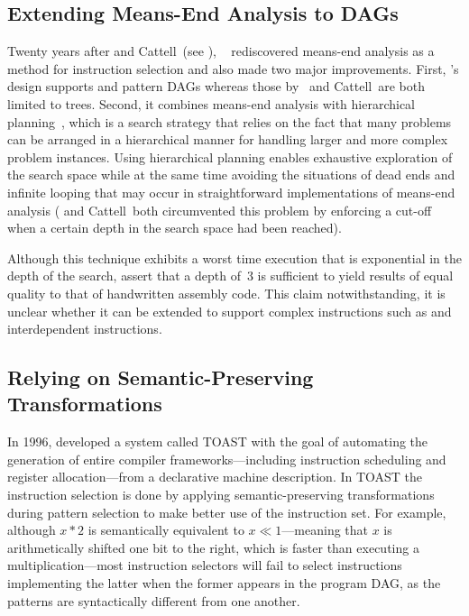 \subsection{Extending Means-End Analysis to DAGs}

Twenty years after \citeauthor{Newcomer1975} and Cattell~\etal (see
),
\citeauthor{Yu1994a}~\cite{Yu1994a, Yu1994b} rediscovered \gls{means-end
  analysis} as a method for \gls{instruction selection} and also made two major
improvements.
%
First, \citeauthor{Yu1994a}'s design supports  and \glspl{pattern DAG} whereas those by~\citeauthor{Newcomer1975} and
Cattell~\etal are both limited to \glspl{tree}.
%
Second, it combines
\gls{means-end analysis} with \gls{hierarchical planning}~\cite{Sacerdoti1973},
which is a search strategy that relies on the fact that many problems can be
arranged in a hierarchical manner for handling larger and more complex problem
instances.
%
Using hierarchical planning enables exhaustive exploration of the
search space while at the same time avoiding the situations of dead ends and
infinite looping that may occur in straightforward implementations of
\gls{means-end analysis} (\citeauthor{Newcomer1975} and Cattell~\etal both
circumvented this problem by enforcing a cut-off when a certain depth in the
search space had been reached).

Although this technique exhibits a worst time execution that is exponential in
the depth of the search, \citeauthor{Yu1994a} assert that a depth of~3 is
sufficient to yield results of equal quality to that of handwritten
\gls{assembly code}.
%
This claim notwithstanding, it is unclear whether it can be
extended to support complex \glspl{instruction} such as  and \glspl{interdependent instruction}.


\subsection{Relying on Semantic-Preserving Transformations}

In 1996, \textcite{Hoover1996} developed a system called \gls{TOAST} with the
goal of automating the generation of entire \gls{compiler}
frameworks---including \gls{instruction scheduling} and \gls{register
  allocation}---from a declarative \gls{machine description}.
%
In \gls{TOAST} the
\gls{instruction selection} is done by applying semantic-preserving
transformations during \gls{pattern selection} to make better use of the
\gls{instruction set}.
%
For example, although \mbox{$x * 2$} is semantically
equivalent to \mbox{$x \ll 1$}---meaning that $x$ is arithmetically shifted one
bit to the right, which is faster than executing a multiplication---most
\glspl{instruction selector} will fail to select \glspl{instruction}
implementing the latter when the former appears in the \gls{program DAG}, as the
\glspl{pattern} are syntactically different from one another.

